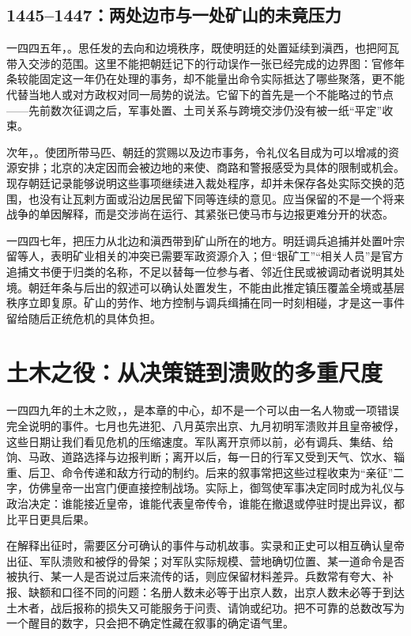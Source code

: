 \subsection{1445--1447：两处边市与一处矿山的未竟压力}

一四四五年，。思任发的去向和边境秩序，既使明廷的处置延续到滇西，也把阿瓦带入交涉的范围。这里不能把朝廷记下的行动误作一张已经完成的边界图：官修年条较能固定这一年仍在处理的事务，却不能量出命令实际抵达了哪些聚落，更不能代替当地人或对方政权对同一局势的说法。它留下的首先是一个不能略过的节点——先前数次征调之后，军事处置、土司关系与跨境交涉仍没有被一纸“平定”收束。

次年，。使团所带马匹、朝廷的赏赐以及边市事务，令礼仪名目成为可以增减的资源安排；北京的决定因而会被边地的来使、商路和警报感受为具体的限制或机会。现存朝廷记录能够说明这些事项继续进入裁处程序，却并未保存各处实际交换的范围，也没有让瓦剌方面或沿边居民留下同等连续的意见。应当保留的不是一个将来战争的单因解释，而是交涉尚在运行、其紧张已使马市与边报更难分开的状态。

一四四七年，把压力从北边和滇西带到矿山所在的地方。明廷调兵追捕并处置叶宗留等人，表明矿业相关的冲突已需要军政资源介入；但“银矿工”“相关人员”是官方追捕文书便于归类的名称，不足以替每一位参与者、邻近住民或被调动者说明其处境。朝廷年条与后出的叙述可以确认处置发生，不能由此推定镇压覆盖全境或基层秩序立即复原。矿山的劳作、地方控制与调兵缉捕在同一时刻相碰，才是这一事件留给随后正统危机的具体负担。

\section{土木之役：从决策链到溃败的多重尺度}

一四四九年的土木之败，，是本章的中心，却不是一个可以由一名人物或一项错误完全说明的事件。七月也先进犯、八月英宗出京、九月初明军溃败并且皇帝被俘，这些日期让我们看见危机的压缩速度。军队离开京师以前，必有调兵、集结、给饷、马政、道路选择与边报判断；离开以后，每一日的行军又受到天气、饮水、辎重、后卫、命令传递和敌方行动的制约。后来的叙事常把这些过程收束为“亲征”二字，仿佛皇帝一出宫门便直接控制战场。实际上，御驾使军事决定同时成为礼仪与政治决定：谁能接近皇帝，谁能代表皇帝传令，谁能在撤退或停驻时提出异议，都比平日更具后果。

在解释出征时，需要区分可确认的事件与动机故事。实录和正史可以相互确认皇帝出征、军队溃败和被俘的骨架；对军队实际规模、营地确切位置、某一道命令是否被执行、某一人是否说过后来流传的话，则应保留材料差异。兵数常有夸大、补报、缺额和口径不同的问题：名册人数未必等于出京人数，出京人数未必等于到达土木者，战后报称的损失又可能服务于问责、请饷或纪功。把不可靠的总数改写为一个醒目的数字，只会把不确定性藏在叙事的确定语气里。

